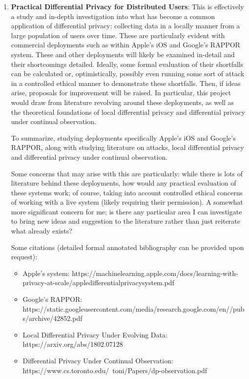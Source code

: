 \documentclass[12pt]{article}
\begin{document}
\begin{enumerate}
\item \textbf{Practical Differential Privacy for Distributed Users}: This is effectively a study and in-depth investigation into what has become a common application of differential privacy: collecting data in a locally manner from a large population of users over time. These are particularly evident with commercial deployments such as within Apple's iOS and Google's RAPPOR system. These and other deployments will likely be examined in-detail and their shortcomings detailed. Ideally, some formal evaluation of their shortfalls can be calculated or, optimistically, possibly even running some sort of attack in a controlled ethical manner to demonstrate these shortfalls. Then, if ideas arise, proposals for improvement will be raised. In particular, this project would draw from literature revolving around these deployments, as well as the theoretical foundations of local differential privacy and differential privacy under continual observation.

To summarize, studying deployments specifically Apple's iOS and Google's RAPPOR, along with studying literature on attacks, local differential privacy and differential privacy under continual observation.

Some concerns that may arise with this are particularly: while there is lots of literature behind these deployments, how would any practical evaluation of these systems work; of course, taking into account controlled ethical concerns of working with a live system (likely requiring their permission). A somewhat more significant concern for me; is there any particular area I can investigate to bring new ideas and suggestion to the literature rather than just reiterate what already exists?

Some citations (detailed formal annotated bibliography can be provided upon request):
\begin{itemize}
	\item Apple's system: https://machinelearning.apple.com/docs/learning-with-privacy-at-scale/appledifferentialprivacysystem.pdf
	\item Google's RAPPOR: https://static.googleusercontent.com/media/research.google.com/en//pubs/archive/42852.pdf
	\item Local Differential Privacy Under Evolving Data: https://arxiv.org/abs/1802.07128
	\item Differential Privacy Under Continual Observation: https://www.cs.toronto.edu/~toni/Papers/dp-observation.pdf
\end{itemize}

\end{enumerate}
\end{document}
